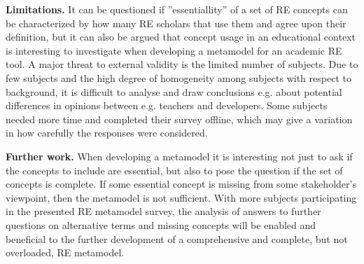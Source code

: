 \documentclass[a4paper]{llncs}
\begin{document}
{\bf Limitations. } It can be questioned if ''essentiallity'' of a set of RE concepts can be characterized by how many RE scholars that use them and agree upon their definition, but it can also be argued that concept usage in an educational context is interesting to investigate when developing a metamodel for an academic RE tool. %
 A major threat to external validity is the limited number of subjects. Due to few subjects and the high degree of homogeneity among subjects with respect to background, it is difficult to analyse and draw conclusions e.g. about potential differences in opinions between e.g. teachers and developers. Some subjects needed more time and completed their survey offline, which may give a variation in how carefully the responses were considered. 
 
{\bf Further work.} When developing a metamodel it is interesting not just to ask if the concepts to include are essential, but also to pose the question if the set of concepts is complete. If some essential concept is missing from some stakeholder's viewpoint, then the metamodel is not sufficient.  With more subjects participating in the presented RE metamodel survey, the analysis of answers to further questions on alternative terms and missing concepts will be enabled and beneficial to the further development of a comprehensive and complete, but not overloaded, RE metamodel. %

\end{document}
